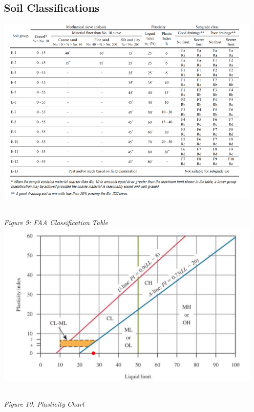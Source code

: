 \documentclass{article}
\begin{document}
\subsection{Soil Classifications}
\begin{center}
\includegraphics*[scale=0.5]{fig1.png}
\emph{\\Figure 9: FAA Classification Table\\}
\vspace{5mm}
\includegraphics*[scale=0.5]{fig2.png}
\emph{\\Figure 10: Plasticity Chart\\}
\vspace{10mm}

\end{center}
\end{document}
